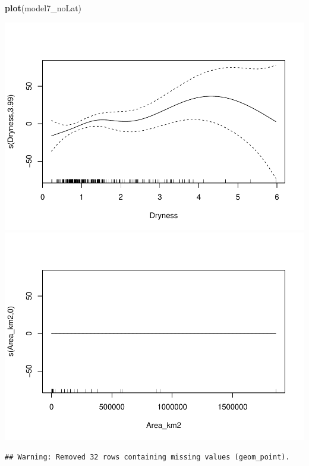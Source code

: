 \documentclass[]{elsarticle} %
\newenvironment{Shaded}{\begin{snugshade}}{\end{snugshade}}
\newcommand{\KeywordTok}[1]{\textcolor[rgb]{0.13,0.29,0.53}{\textbf{#1}}}
\newcommand{\NormalTok}[1]{#1}
\begin{document}
\begin{Shaded}
\begin{Highlighting}[]
\KeywordTok{plot}\NormalTok{(model7_noLat)}
\end{Highlighting}
\end{Shaded}

\includegraphics{Forest_and_Water_files/figure-latex/model7_noLat-1.pdf}
\includegraphics{Forest_and_Water_files/figure-latex/model7_noLat-2.pdf}

\begin{verbatim}
## Warning: Removed 32 rows containing missing values (geom_point).
\end{verbatim}
\end{document}
